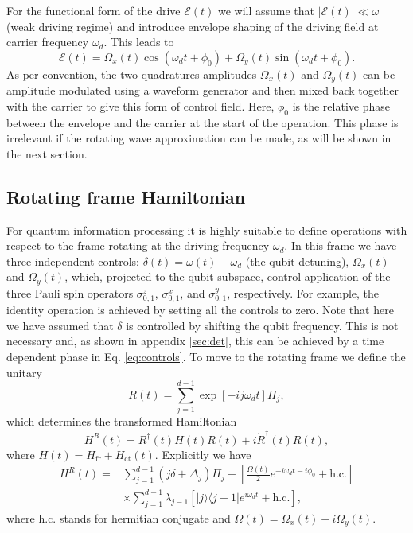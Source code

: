 \documentclass[pra,twocolumn,floatfix,superscriptaddress,eqsecnum]{revtex4-1}
\newcommand{\bra}[1]{\langle{#1}|}
\newcommand{\ket}[1]{|{#1}\rangle}
\begin{document}
For the functional form of the drive $\mathcal{E}(t)$ we will assume that  $\left|\mathcal{E}(t)\right| \ll \omega$ (weak driving regime) and introduce envelope shaping of the driving field at carrier frequency $\omega_d$.  This leads to
\begin{equation}\label{eq:controls}
\mathcal{E}(t)=\Omega_x(t)\cos(\omega_d t + \phi_0)+\Omega_y(t)\sin(\omega_d t + \phi_0).
\end{equation}
As per convention, the two quadratures amplitudes $\Omega_x(t)$ and $\Omega_y(t)$ can be amplitude modulated using a waveform generator and then mixed back together with the carrier to give this form of control field. Here,
$\phi_0$ is the relative phase between the envelope and the carrier at the start of the operation. This phase is irrelevant if the rotating wave approximation can be made, as will be shown in the next section.

\subsection{Rotating frame Hamiltonian}\label{sec:Rot}

For quantum information processing it is highly suitable to define operations with respect to the frame rotating at the  driving frequency  $\omega_d$. In this frame we have three independent controls: $\delta(t) = \omega(t)-\omega_d$ (the qubit detuning), $\Omega_x(t)$ and $\Omega_y(t)$, which, projected to the qubit subspace, control application of the three Pauli spin operators $\sigma_{0,1}^z$, $\sigma_{0,1}^x$, and $\sigma_{0,1}^y$, respectively. For example, the identity operation is achieved by setting all the controls to zero. Note that here we have assumed that $\delta$ is controlled by shifting the qubit frequency. This is not necessary and, as shown in appendix \ref{sec:det}, this can be achieved by a time dependent phase in Eq. \eqref{eq:controls}. To move to the rotating frame we define the unitary 
\begin{equation}\label{eq:rot}
 R(t)=\sum_{j=1}^{d-1}\exp\left[-i j\omega_d t \right]\Pi_j,
\end{equation} which determines the transformed Hamiltonian
\begin{equation}\label{eq:rotransf}
 H^R(t)=R^\dagger(t)  H(t) R(t)+i\dot R^\dagger(t) R(t),
\end{equation} where $H(t)=H_\mathrm{fr}+H_\mathrm{ct}(t)$. Explicitly we have
\begin{equation}
 \begin{split}
H^R(t)=&\sum_{j=1}^{d-1}(j\delta+\Delta_j)\Pi_j + \left[\frac{\Omega(t)}{2}e^{-i\omega_d t-i\phi_0}+\mathrm{h.c.}\right]\\&\times\sum_{j=1}^{d-1}\lambda_{j-1}\left[\ket{j}\bra{j-1}e^{i\omega_d t}+\mathrm{h.c.}\right],\end{split}
\end{equation} where h.c. stands for hermitian conjugate and $\Omega(t) = \Omega_x(t)+i\Omega_y(t)$.
\end{document}
